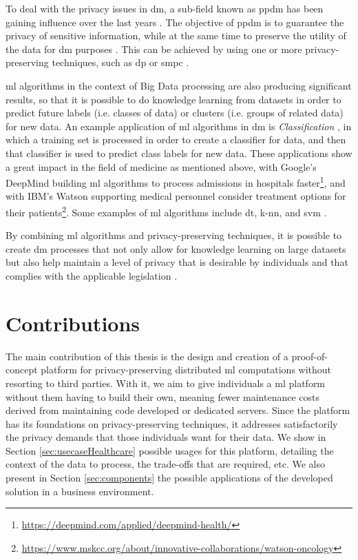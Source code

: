 To deal with the privacy issues in \ac{dm}, a sub-field known as \ac{ppdm} has been gaining influence over the last years \cite{DAcquisto2015}. The objective of \ac{ppdm} is to guarantee the privacy of sensitive information, while at the same time to preserve the utility of the data for \ac{dm} purposes \cite{agrawal2000privacy}.
This can be achieved by using one or more privacy-preserving techniques, such as \ac{dp} \cite{Danezis2015} or \ac{smpc} \cite{DAcquisto2015}.


\ac{ml} algorithms in the context of Big Data processing are also producing significant results, so that it is possible to do knowledge learning from datasets in order to predict future labels (i.e. classes of data) or clusters (i.e. groups of related data) for new data. An example application of \ac{ml} algorithms in \ac{dm} is \textit{Classification} \cite{LeiXu2014}, in which a training set is processed in order to create a classifier for data, and then that classifier is used to predict class labels for new data. These applications show a great impact in the field of medicine as mentioned above, with Google's DeepMind building \ac{ml} algorithms to process admissions in hospitals faster\footnote{\url{https://deepmind.com/applied/deepmind-health/}}, and with IBM's Watson supporting medical personnel consider treatment options for their patients\footnote{\url{https://www.mskcc.org/about/innovative-collaborations/watson-oncology}}.
Some examples of \ac{ml} algorithms include \ac{dt}, \ac{k-nn}, and \ac{svm} \cite{LeiXu2014}.

By combining \ac{ml} algorithms and privacy-preserving techniques, it is possible to create \ac{dm} processes that not only allow for knowledge learning on large datasets but also help maintain a level of privacy that is desirable by individuals and that complies with the applicable legislation \cite{DAcquisto2015}.



\section{Contributions}
\label{sec:Intro_Contributions}

The main contribution of this thesis is the design and creation of a proof-of-concept platform for privacy-preserving distributed \ac{ml} computations without resorting to third parties. With it, we aim to give individuals a \ac{ml} platform without them having to build their own, meaning fewer maintenance costs derived from maintaining code developed or dedicated servers. Since the platform has its foundations on privacy-preserving techniques, it addresses satisfactorily the privacy demands that those individuals want for their data.
We show in Section \ref{sec:usecaseHealthcare} possible usages for this platform, detailing the context of the data to process, the trade-offs that are required, etc. We also present in Section \ref{sec:components} the possible applications of the developed solution in a business environment.

